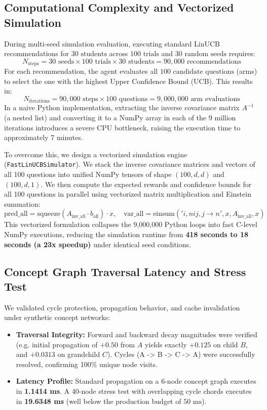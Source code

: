 \documentclass{article}
\begin{document}
\subsection{Computational Complexity and Vectorized Simulation}\label{app:vectorized_sim}
During multi-seed simulation evaluation, executing standard LinUCB recommendations for $30 \text{ students}$ across $100 \text{ trials}$ and $30 \text{ random seeds}$ requires:
\[N_{\text{steps}} = 30 \text{ seeds} \times 100 \text{ trials} \times 30 \text{ students} = 90,000 \text{ recommendations}\]
For each recommendation, the agent evaluates all $100 \text{ candidate questions}$ (arms) to select the one with the highest Upper Confidence Bound (UCB). This results in:
\[N_{\text{iterations}} = 90,000 \text{ steps} \times 100 \text{ questions} = 9,000,000 \text{ arm evaluations}\]
In a naive Python implementation, extracting the inverse covariance matrix $A^{-1}$ (a nested list) and converting it to a NumPy array in each of the 9 million iterations introduces a severe CPU bottleneck, raising the execution time to approximately 7 minutes. 

To overcome this, we design a vectorized simulation engine (\texttt{FastLinUCBSimulator}). We stack the inverse covariance matrices and vectors of all 100 questions into unified NumPy tensors of shape $(100, d, d)$ and $(100, d, 1)$. We then compute the expected rewards and confidence bounds for all 100 questions in parallel using vectorized matrix multiplication and Einstein summation:
\[\text{pred\_all} = \text{squeeze}(A_{\text{inv\_all}} \cdot b_{\text{all}}) \cdot x, \quad \text{var\_all} = \text{einsum}('i,nij,j\rightarrow n', x, A_{\text{inv\_all}}, x)\]
This vectorized formulation collapses the 9,000,000 Python loops into fast C-level NumPy executions, reducing the simulation runtime from \textbf{418 seconds to 18 seconds (a 23x speedup)} under identical seed conditions.

\subsection{Concept Graph Traversal Latency and Stress Test}\label{app:propagation_perf}
We validated cycle protection, propagation behavior, and cache invalidation under synthetic concept networks:
\begin{itemize}
    \item \textbf{Traversal Integrity:} Forward and backward decay magnitudes were verified (e.g. initial propagation of $+0.50$ from $A$ yields exactly $+0.125$ on child $B$, and $+0.0313$ on grandchild $C$). Cycles (A -> B -> C -> A) were successfully resolved, confirming 100\% unique node visits.
    \item \textbf{Latency Profile:} Standard propagation on a 6-node concept graph executes in \textbf{1.1414 ms}. A 40-node stress test with overlapping cycle chords executes in \textbf{19.6348 ms} (well below the production budget of $50\text{ ms}$).
\end{itemize}
\end{document}
